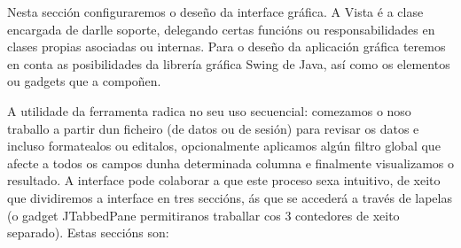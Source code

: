 Nesta sección configuraremos o deseño da interface gráfica. A Vista é a clase encargada de darlle soporte, delegando certas funcións ou responsabilidades en clases propias asociadas ou internas. Para o deseño da aplicación gráfica teremos en conta as posibilidades da librería gráfica Swing de Java, así como os elementos ou gadgets que a compoñen. 

A utilidade da ferramenta radica no seu uso secuencial: comezamos o noso traballo a partir dun ficheiro (de datos ou de sesión) para revisar os datos e incluso formatealos ou editalos, opcionalmente aplicamos algún filtro global que afecte a todos os campos dunha determinada columna e finalmente visualizamos o resultado. A interface pode colaborar a que este proceso sexa intuitivo, de xeito que dividiremos a interface en tres seccións, ás que se accederá a través de lapelas (o gadget JTabbedPane permitiranos traballar cos 3 contedores de xeito separado). Estas seccións son:

